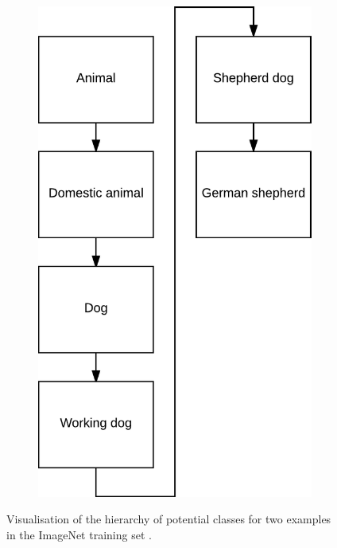 \begin{figure}[H]
\begin{subfigure}[b]{0.25\textwidth}
        \caption{}\label{fig:interhier2a}
    \end{subfigure}
    \begin{subfigure}[b]{0.20\textwidth}
        \center
        \includegraphics[width=\textwidth]{Figs/Problem/german_hier.png}
        \caption{}\label{fig:interhier2b}
    \end{subfigure}
    \caption{Visualisation of the hierarchy of potential classes for two examples in the ImageNet training set \cite{imagenet}.}
    \label{fig:inter1_hierachy}
\end{figure}


